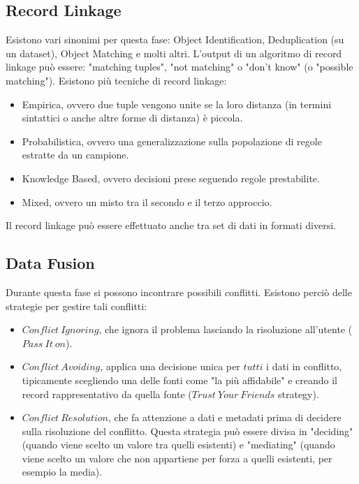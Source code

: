 \documentclass[a4page, 11pt]{article}
\begin{document}
\subsection{Record Linkage}
Esistono vari sinonimi per questa fase: Object Identification, Deduplication (su un dataset), Object Matching e molti altri. L’output di un algoritmo di record linkage può essere: "matching tuples", "not matching" o "don’t know" (o "possible matching").\newline
Esistono più tecniche di record linkage:
\begin{itemize}[noitemsep]
\item Empirica, ovvero due tuple vengono unite se la loro distanza (in termini sintattici o anche altre forme di distanza) è piccola.
\item Probabilistica, ovvero una generalizzazione sulla popolazione di regole estratte da un campione.
\item Knowledge Based, ovvero decisioni prese seguendo regole prestabilite.
\item Mixed, ovvero un misto tra il secondo e il terzo approccio.
\end{itemize}
Il record linkage può essere effettuato anche tra set di dati in formati diversi.
\subsection{Data Fusion}
Durante questa fase si possono incontrare possibili conflitti.\newline 
Esistono perciò delle strategie per gestire tali conflitti:
\begin{itemize}[noitemsep]
\item $Conflict\ Ignoring$, che ignora il problema lasciando la risoluzione all’utente ($Pass\ It\ on$).
\item $Conflict\ Avoiding$, applica una decisione unica per $tutti$ i dati in conflitto, tipicamente scegliendo una delle fonti come "la più affidabile" e creando il record rappresentativo da quella fonte ($Trust\ Your\ Friends$ strategy).
\item $Conflict\ Resolution$, che fa attenzione a dati e metadati prima di decidere sulla risoluzione del conflitto. Questa strategia può essere divisa in "deciding" (quando viene scelto un valore tra quelli esistenti) e "mediating" (quando viene scelto un valore che non appartiene per forza a quelli esistenti, per esempio la media).
\end{itemize}
\clearpage
\nocite{*}
\printbibliography
\end{document}
